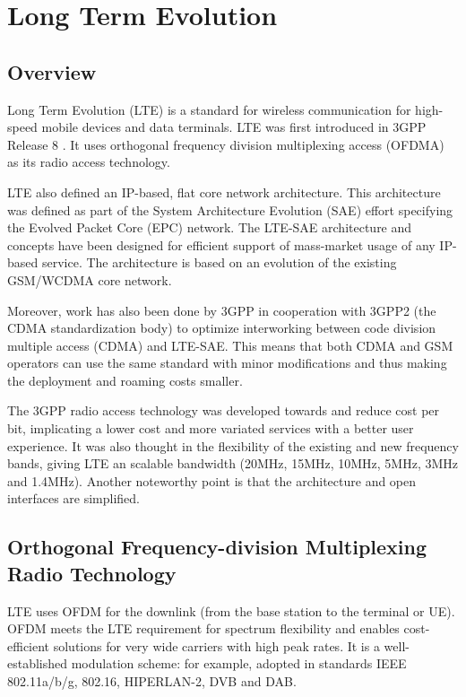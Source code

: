 \chapter{Long Term Evolution}
\label{chap:lte}

\section{Overview}

Long Term Evolution (LTE) is a standard for wireless communication for
high-speed mobile devices and data terminals. LTE was first introduced in 3GPP
Release 8 \cite{introlte}. It uses orthogonal frequency division multiplexing
access (OFDMA) as its radio access technology.

LTE also defined an IP-based, flat core network architecture. This architecture
was defined as part of the System Architecture Evolution (SAE) effort specifying
the Evolved Packet Core (EPC) network. The LTE-SAE architecture and concepts
have been designed for efficient support of mass-market usage of any IP-based
service. The architecture is based on an evolution of the existing GSM/WCDMA
core network.

Moreover, work has also been done by 3GPP in cooperation with 3GPP2
\cite{introlte} (the CDMA standardization body) to optimize interworking between
code division multiple access (CDMA) and LTE-SAE. This means that both CDMA and
GSM operators can use the same standard with minor modifications and thus making
the deployment and roaming costs smaller.

The 3GPP radio access technology was developed towards and reduce cost per bit,
implicating a lower cost and more variated services with a better user
experience. It was also thought in the flexibility of the existing and new
frequency  bands, giving LTE an scalable bandwidth (20MHz, 15MHz, 10MHz, 5MHz,
3MHz and 1.4MHz). Another noteworthy point is that the architecture and open
interfaces are simplified.

\section{Orthogonal Frequency-division Multiplexing Radio Technology} %

LTE uses OFDM for the downlink (from the base station to the terminal or UE).
OFDM meets the LTE requirement for spectrum flexibility and enables
cost-efficient solutions for very wide carriers with high peak rates. It is a
well-established modulation scheme: for example, adopted in standards IEEE
802.11a/b/g, 802.16, HIPERLAN-2, DVB and DAB.

